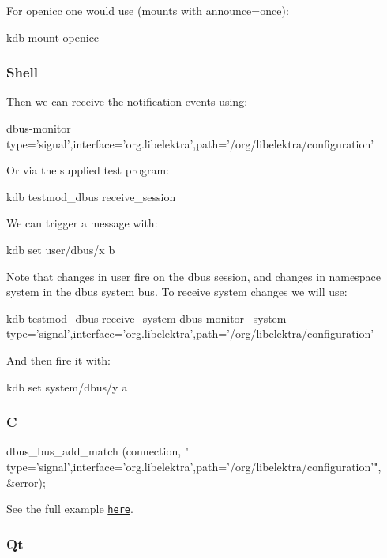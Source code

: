 For openicc one would use (mounts with announce=once)\+: \begin{DoxyVerb}    kdb mount-openicc
\end{DoxyVerb}


\subsubsection*{Shell}

Then we can receive the notification events using\+: \begin{DoxyVerb}    dbus-monitor type='signal',interface='org.libelektra',path='/org/libelektra/configuration'
\end{DoxyVerb}


Or via the supplied test program\+: \begin{DoxyVerb}    kdb testmod_dbus receive_session
\end{DoxyVerb}


We can trigger a message with\+: \begin{DoxyVerb}    kdb set user/dbus/x b
\end{DoxyVerb}


Note that changes in {\ttfamily user} fire on the dbus {\ttfamily session}, and changes in namespace {\ttfamily system} in the dbus {\ttfamily system} bus. To receive {\ttfamily system} changes we will use\+: \begin{DoxyVerb}    kdb testmod_dbus receive_system
    dbus-monitor --system type='signal',interface='org.libelektra',path='/org/libelektra/configuration'
\end{DoxyVerb}


And then fire it with\+: \begin{DoxyVerb}    kdb set system/dbus/y a
\end{DoxyVerb}


\subsubsection*{C}


\begin{DoxyCode}
dbus\_bus\_add\_match (connection, \textcolor{stringliteral}{"
      type='signal',interface='org.libelektra',path='/org/libelektra/configuration'"}, &error);
\end{DoxyCode}


See the full example \href{/home/markus/Projekte/Elektra/current/src/plugins/dbus/receivemessage.c}{\tt here}.

\subsubsection*{Qt}

